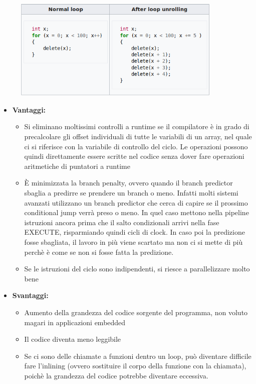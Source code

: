 \documentclass[a4paper, 11pt,            %
openright,               %
italian,
english                 
]{article}       %
\begin{document}
	\begin{figure}[H]
		\centering
		\includegraphics[width=10cm]{loop_unrolling.png}
	\end{figure}

	\begin{itemize}
		\item \textbf{Vantaggi:}
		\begin{itemize}
			\item Si eliminano moltissimi controlli a runtime se il compilatore è in grado di precalcolare gli offset individuali di tutte le variabili di un array, nel quale ci si riferisce con la variabile di controllo del ciclo. Le operazioni possono quindi direttamente essere scritte nel codice senza dover fare operazioni aritmetiche di puntatori a runtime
			\item È minimizzata la branch penalty, ovvero quando il branch predictor sbaglia a predirre se prendere un branch o meno. Infatti molti sistemi avanzati utilizzano un branch predictor che cerca di capire se il prossimo conditional jump verrà preso o meno. In quel caso mettono nella pipeline istruzioni ancora prima che il salto condizionali arrivi nella fase EXECUTE, risparmiando quindi cicli di clock. In caso poi la predizione fosse sbagliata, il lavoro in più viene scartato ma non ci si mette di più perchè è come se non si fosse fatta la predizione. 
			\item Se le istruzioni del ciclo sono indipendenti, si riesce a parallelizzare molto bene
		\end{itemize}
		\item\textbf{Svantaggi:}
		\begin{itemize}
			\item Aumento della grandezza del codice sorgente del programma, non voluto magari in applicazioni embedded
			\item Il codice diventa meno leggibile
			\item Se ci sono delle chiamate a funzioni dentro un loop, può diventare difficile fare l'inlining (ovvero sostituire il corpo della funzione con la chiamata), poichè la grandezza del codice potrebbe diventare eccessiva. 
		\end{itemize} 
	\end{itemize}
\end{document}
